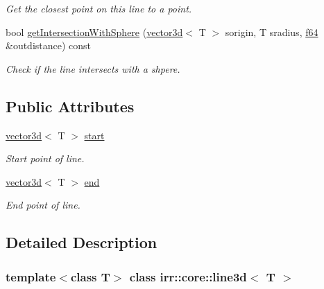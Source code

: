 \begin{DoxyCompactItemize}
\begin{DoxyCompactList}\small\item\em Get the closest point on this line to a point. \end{DoxyCompactList}\item 
bool \hyperlink{classirr_1_1core_1_1line3d_a1315915ed1b1fb8a11eb8b561be193a0}{get\+Intersection\+With\+Sphere} (\hyperlink{classirr_1_1core_1_1vector3d}{vector3d}$<$ T $>$ sorigin, T sradius, \hyperlink{namespaceirr_a1325b02603ad449f92c68fc640af9b28}{f64} \&outdistance) const
\begin{DoxyCompactList}\small\item\em Check if the line intersects with a shpere. \end{DoxyCompactList}\end{DoxyCompactItemize}
\subsection*{Public Attributes}
\begin{DoxyCompactItemize}
\item 
\mbox{\label{classirr_1_1core_1_1line3d_a6b7683c8ac164e209b195fc439269a1b}} 
\hyperlink{classirr_1_1core_1_1vector3d}{vector3d}$<$ T $>$ \hyperlink{classirr_1_1core_1_1line3d_a6b7683c8ac164e209b195fc439269a1b}{start}
\begin{DoxyCompactList}\small\item\em Start point of line. \end{DoxyCompactList}\item 
\mbox{\label{classirr_1_1core_1_1line3d_a49cd73380569e7e6958369520fe1b7bf}} 
\hyperlink{classirr_1_1core_1_1vector3d}{vector3d}$<$ T $>$ \hyperlink{classirr_1_1core_1_1line3d_a49cd73380569e7e6958369520fe1b7bf}{end}
\begin{DoxyCompactList}\small\item\em End point of line. \end{DoxyCompactList}\end{DoxyCompactItemize}


\subsection{Detailed Description}
\subsubsection*{template$<$class T$>$\newline
class irr\+::core\+::line3d$<$ T $>$}

